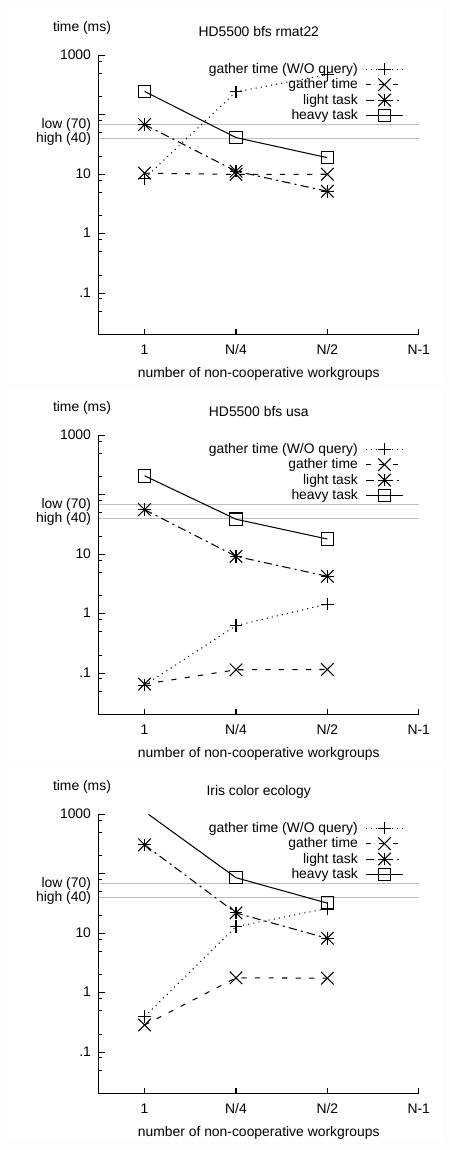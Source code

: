 \documentclass[sigconf]{acmart}
\begin{document}
{\includegraphics[width=.7\columnwidth]{images/barrier/hd5500_bfs_rmat22.pdf} \\
\includegraphics[width=.7\columnwidth]{images/barrier/hd5500_bfs_usa.pdf} \\
\includegraphics[width=.7\columnwidth]{images/barrier/iris_color_ecology.pdf} \\
}
\end{document}
